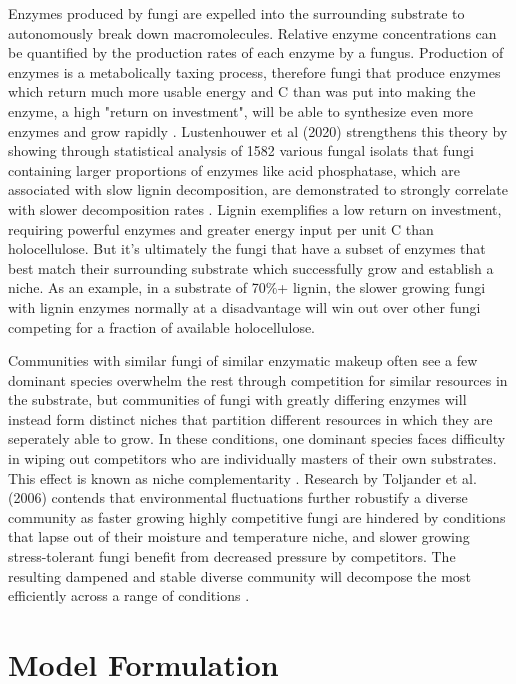 \documentclass[12pt]{article}
\begin{document}
\begin{multicols}{2}
Enzymes produced by fungi are expelled into the surrounding substrate to autonomously break down macromolecules. Relative enzyme concentrations can be quantified by the production rates of each enzyme by a fungus. Production of enzymes is a metabolically taxing process, therefore fungi that produce enzymes which return much more usable energy and C than was put into making the enzyme, a high "return on investment", will be able to synthesize even more enzymes and grow rapidly \cite{Schimel2003}. Lustenhouwer et al (2020) strengthens this theory by showing through statistical analysis of 1582 various fungal isolats that fungi containing larger proportions of enzymes like acid phosphatase, which are associated with slow lignin decomposition, are demonstrated to strongly correlate with slower decomposition rates \cite{Lustenhouwer2020}. Lignin exemplifies a low return on investment, requiring powerful enzymes and greater energy input per unit C than holocellulose. But it's ultimately the fungi that have a subset of enzymes that best match their surrounding substrate which successfully grow and establish a niche. As an example, in a substrate of 70\%+ lignin, the slower growing fungi with lignin enzymes normally at a disadvantage will win out over other fungi competing for a fraction of available holocellulose.

Communities with similar fungi of similar enzymatic makeup often see a few dominant species overwhelm the rest through competition for similar resources in the substrate, but communities of fungi with greatly differing enzymes will instead form distinct niches that partition different resources in which they are seperately able to grow. In these conditions, one dominant species faces difficulty in wiping out competitors who are individually masters of their own substrates. This effect is known as niche complementarity \cite{Toljander2006}. Research by Toljander et al. (2006) contends that environmental fluctuations further robustify a diverse community as faster growing highly competitive fungi are hindered by conditions that lapse out of their moisture and temperature niche, and slower growing stress-tolerant fungi benefit from decreased pressure by competitors. The resulting dampened and stable diverse community will decompose the most efficiently across a range of conditions \cite{Toljander2006}.

\section{Model Formulation}



\end{multicols}
\end{document}
